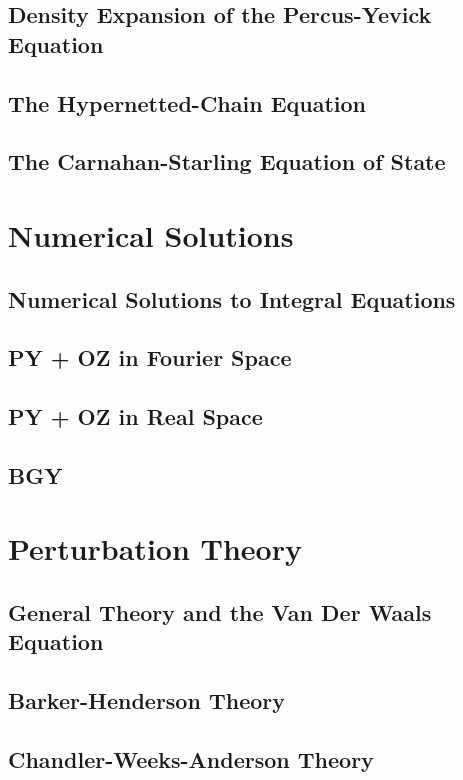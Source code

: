 \documentclass[a4paper,11pt]{article}
\begin{document}
\subsection{Density Expansion of the Percus-Yevick Equation}
\subsection{The Hypernetted-Chain Equation}
\subsection{The Carnahan-Starling Equation of State}

\section{Numerical Solutions}
\subsection{Numerical Solutions to Integral Equations}

\subsection{PY + OZ in Fourier Space}

\subsection{PY + OZ in Real Space}

\subsection{BGY}


\section{Perturbation Theory}
\subsection{General Theory and the Van Der Waals Equation}
\subsection{Barker-Henderson Theory}
\subsection{Chandler-Weeks-Anderson Theory}
\end{document}
